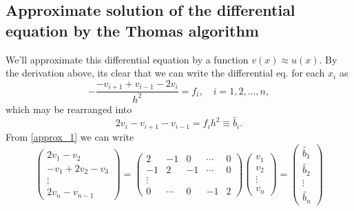 \documentclass[english,notitlepage]{revtex4-1}  %
\begin{document}
\subsection{Approximate solution of the differential equation by the Thomas algorithm}
We'll approximate this differential equation by a function $v(x) \approx u(x)$. By the derivation above, its clear that we can write the differential eq. for each $x_i$ as 
\begin{equation}
	-\frac{-v_{i+1}+v_{i-1} - 2v_i}{h^2} = f_i, \quad i=1,2,...,n,
\end{equation}
which may be rearranged into 
\begin{equation}\label{approx_1}
	2v_i - v_{i+1} - v_{i-1} = f_ih^2 \equiv \tilde{b_i}.
\end{equation}
From \eqref{approx_1} we can write 
\begin{equation}
	\begin{pmatrix}
	2v_1 - v_2 \\ 
	-v_1 + 2v_2 - v_3 \\ 
	\vdots \\
	2v_n - v_{n-1}
	\end{pmatrix}
	=
	\begin{pmatrix}
	2 & -1 & 0  & \cdots & 0 \\
	-1 & 2 & -1 & \cdots & 0 \\
	\vdots \\
	0 & \cdots & 0 & -1 & 2 
	\end{pmatrix}
	\begin{pmatrix}
	v_1 \\ v_2 \\ \vdots \\ v_n
	\end{pmatrix}
	= \begin{pmatrix}
	\tilde{b_1} \\ \tilde{b_2} \\ \vdots \\ \tilde{b_n}
	\end{pmatrix}
\end{equation}
\end{document}
